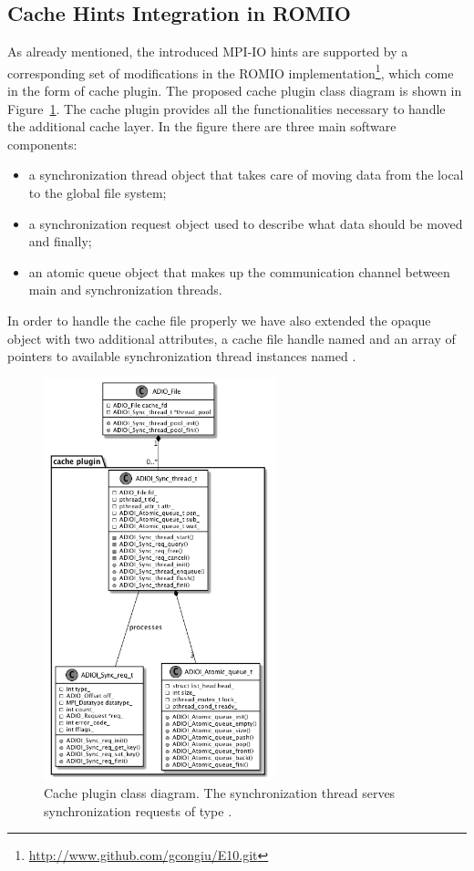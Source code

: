 \subsection{Cache Hints Integration in ROMIO}
As already mentioned, the introduced MPI-IO hints are supported by a corresponding set of modifications in the ROMIO implementation\footnote{\url{http://www.github.com/gcongiu/E10.git}},
which come in the form of cache plugin. The proposed cache plugin class diagram is shown in Figure~\ref{figure: cache-plugin-class}. The cache plugin provides all the functionalities 
necessary to handle the additional cache layer. In the figure there are three main software components: 

\begin{itemize}
\item a synchronization thread object that takes care of moving data from the local to the global file system;
\item a synchronization request object used to describe what data should be moved and finally;
\item an atomic queue object that makes up the communication channel between main and synchronization threads. 
\end{itemize}

In order to handle the cache file properly we have also extended the  opaque object with two additional attributes, a cache file handle named  and 
an array of pointers to available synchronization thread instances named .

\begin{figure}[!htb]
  \centering
  \includegraphics[width=0.6\textwidth]{figures/cache_architecture}
  \caption{Cache plugin class diagram. The synchronization thread  serves synchronization requests of type .}
  \label{figure: cache-plugin-class}
\end{figure}

